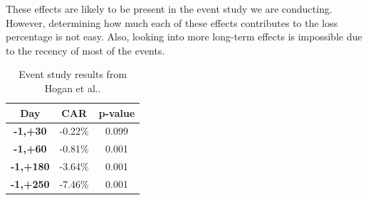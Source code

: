 These effects are likely to be present in the event study we are conducting. However, determining how much each of these effects contributes to the loss percentage is not easy. Also, looking into more long-term effects is impossible due to the recency of most of the events.




\begin{table}[h]
    \centering
    \caption{Event study results from Hogan et al.\cite{hogan2020comprehensive}.}
    \label{tab:esHogan}
    \begin{tabular}{|c|c|c|}
        \hline
        \textbf{Day} & \textbf{CAR}  & \textbf{p-value} \\
        \hline
        \textbf{-1,+30}  & -0.22\%    & 0.099 \\
        \hline
        \textbf{-1,+60}  & -0.81\%    & 0.001 \\
        \hline
        \textbf{-1,+180}  & -3.64\%   & 0.001 \\
        \hline
        \textbf{-1,+250}  & -7.46\%    & 0.001 \\
        \hline
    \end{tabular}
\end{table}
